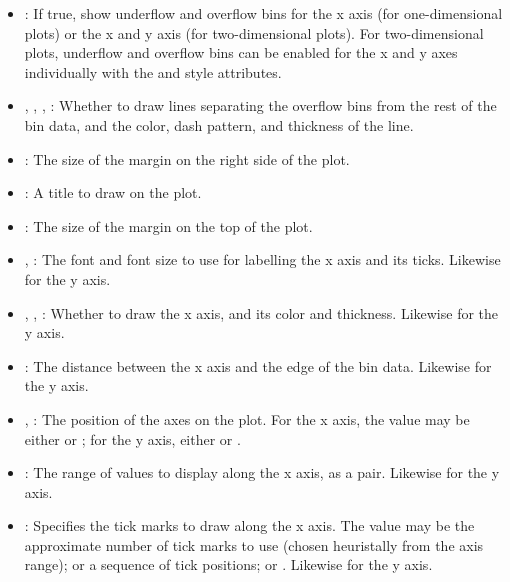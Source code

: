 \begin{itemize}
 \item {}: If true, show underflow and overflow bins for
 the x axis (for one-dimensional plots) or the x and y axis (for
 two-dimensional plots).  For two-dimensional plots, underflow and
 overflow bins can be enabled for the x and y axes individually with the
  and  style
 attributes.

 \item {}, ,
 , : Whether
 to draw lines separating the overflow bins from the rest of the bin
 data, and the color, dash pattern, and thickness of the line.

 \item {}: The size of the margin on the right side
 of the plot.

 \item {}: A title to draw on the plot.

 \item {}: The size of the margin on the top of the
 plot.

 \item {}, : The font and
 font size to use for labelling the x axis and its ticks.  Likewise for
 the y axis.

 \item {}, , 
 : Whether to draw the x axis, and its color
 and thickness.  Likewise for the y axis.

 \item {}: The distance between the x axis and the
 edge of the bin data.  Likewise for the y axis.

 \item {}, : The position
 of the axes on the plot.  For the x axis, the value may be either
  or ; for the y axis, either 
 or .

 \item {}: The range of values to display along the x
 axis, as a  pair.  Likewise for the y axis.

 \item {}: Specifies the tick marks to draw along the
 x axis.  The value may be the approximate number of tick marks to use
 (chosen heuristally from the axis range); or a sequence of tick
 positions; or .  Likewise for the y axis.


\end{itemize}
